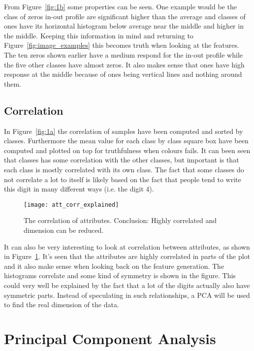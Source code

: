 From Figure~\ref{fig:1b} some properties can be seen. One example would be the class of zeros in-out profile are significant higher than the average and classes of ones have its horizontal histogram below average near the middle and higher in the middle. Keeping this information in mind and returning to Figure~\ref{fig:image_examples} this becomes truth when looking at the features. The ten zeros shown earlier have a medium respond for the in-out profile while the five other classes have almost zeros. It also makes sense that ones have high response at the middle because of ones being vertical lines and nothing around them.

\subsection{Correlation}
In Figure~\ref{fig:1a} the correlation of samples have been computed and sorted by classes. Furthermore the mean value for each class by class square box have been computed and plotted on top for truthfulness when colours fails. It can been seen that classes has some correlation with the other classes, but important is that each class is mostly correlated with its own class. The fact that some classes do not correlate a lot to itself is likely based on the fact that people tend to write this digit in many different ways (i.e. the digit 4).

\begin{figure}[hbtp]
\centering
\texttt{[image: att\_corr\_explained]}
\caption{The correlation of attributes. Conclusion: Highly correlated and dimension can be reduced.\label{fig:att_corr_explained}}
\end{figure}

It can also be very interesting to look at correlation between attributes, as shown in Figure~\ref{fig:att_corr_explained}. It's seen that the attributes are highly correlated in parts of the plot and it also make sense when looking back on the feature generation. The histograms correlate and some kind of symmetry is shown in the figure. This could very well be explained by the fact that a lot of the digits actually also have symmetric parts. Instead of speculating in such relationships, a PCA will be used to find the real dimension of the data.  


\section{Principal Component Analysis}
